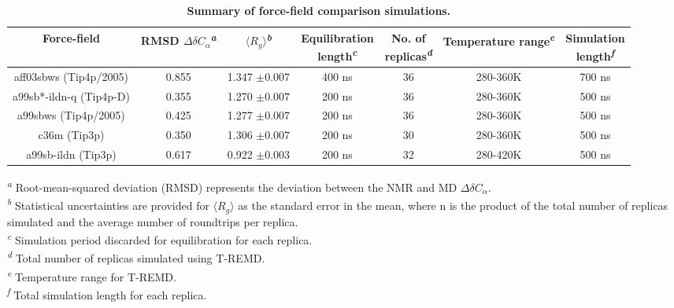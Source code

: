 \documentclass[10pt,letterpaper]{article}
\begin{document}


\begin{table}[!ht]
\begin{adjustwidth}{-2.25in}{0in} %
\centering
\caption{\bf Summary of force-field comparison simulations.}
\label{table2}
\begin{tabular}{|c|c|c|c|c|c|c|} 
\hline 
Force-field & \makecell{RMSD \\ $\Delta$$\delta$$C_{\alpha}$}\textsuperscript{\emph{a}} & $\langle R_{g} \rangle$\textsuperscript{\emph{b}} & \makecell{Equilibration\\length}\textsuperscript{\emph{c}} & \makecell{No. of\\replicas}\textsuperscript{\emph{d}} & Temperature range\textsuperscript{\emph{e}} & \makecell{Simulation\\length}\textsuperscript{\emph{f}} \\
\hline
aff03sbws (Tip4p/2005) & 0.855 & 1.347 $\pm{0.007}$ & 400 ns & 36 & 280-360K & 700 ns \\
\hline
a99sb*-ildn-q (Tip4p-D) & 0.355 & 1.270 $\pm{0.007}$ & 200 ns & 36 & 280-360K & 500 ns\\
\hline
a99sbws (Tip4p/2005) & 0.425 & 1.277 $\pm{0.007}$ & 200 ns & 36 & 280-360K & 500 ns\\
\hline
c36m (Tip3p) & 0.350 & 1.306 $\pm{0.007}$ & 200 ns & 30 & 280-360K & 500 ns\\
\hline
a99sb-ildn (Tip3p) & 0.617 & 0.922 $\pm{0.003}$ & 200 ns & 32 & 280-420K & 500 ns\\
\hline
\end{tabular}
\begin{flushleft}
\textsuperscript{\emph{a}} Root-mean-squared deviation (RMSD) represents the deviation between the NMR and MD $\Delta$$\delta$$C_{\alpha}$.\\
\textsuperscript{\emph{b}} Statistical uncertainties are provided for $\langle R_{g} \rangle$ as the standard error in the mean, where n is the product of the total number of replicas simulated and the average number of roundtrips per replica.\\
\textsuperscript{\emph{c}} Simulation period discarded for equilibration for each replica.\\
\textsuperscript{\emph{d}} Total number of replicas simulated using T-REMD.\\
\textsuperscript{\emph{e}} Temperature range for T-REMD.\\
\textsuperscript{\emph{f}} Total simulation length for each replica.\\
\end{flushleft}
\end{adjustwidth}
\end{table}
\end{document}
